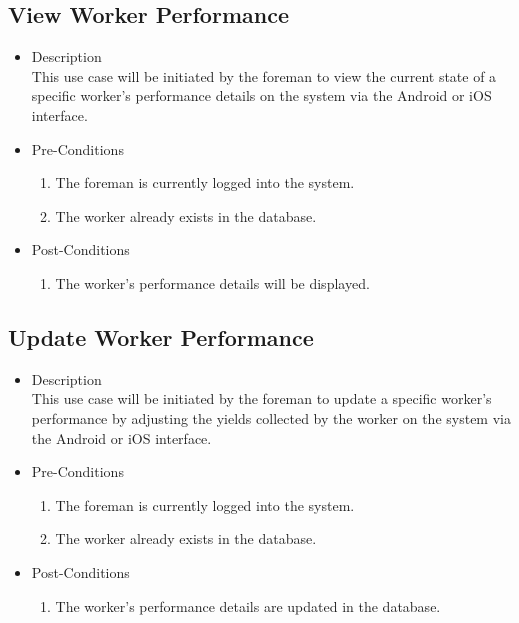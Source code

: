 \documentclass[11pt,fleqn]{book} %
\begin{document}
		\subsection{View Worker Performance}
		\begin{itemize}
			\item Description\\
			This use case will be initiated by the foreman to view the current state of a specific worker’s performance details on the system via the Android or iOS interface.
			\item Pre-Conditions
			\begin{enumerate}
				\item The foreman is currently logged into the system.
				\item The worker already exists in the database.				 
			\end{enumerate}
			\item Post-Conditions
			\begin{enumerate}
				\item The worker’s performance details will be displayed.
			\end{enumerate}
		\end{itemize}
		
		\subsection{Update Worker Performance}
		\begin{itemize}
			\item Description\\
			This use case will be initiated by the foreman to update a specific worker’s performance by adjusting the yields collected by the worker on the system via the Android or iOS interface.
			\item Pre-Conditions
			\begin{enumerate}
				\item The foreman is currently logged into the system.
				\item The worker already exists in the database.			
			\end{enumerate}
			\item Post-Conditions
			\begin{enumerate}
				\item The worker’s performance details are updated in the database.
			\end{enumerate}
		\end{itemize}
		
\end{document}
